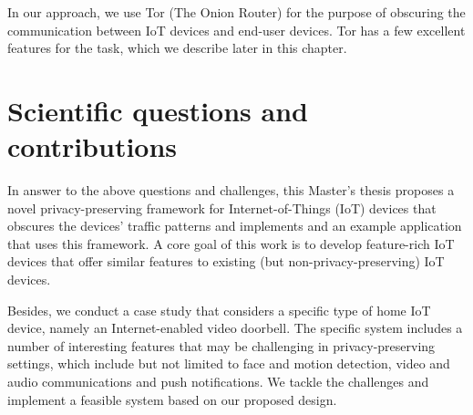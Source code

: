In our approach, we use Tor (The Onion Router) for the purpose of obscuring the communication between IoT devices and end-user devices. Tor has a few excellent features for the task, which we describe later in this chapter.

\section{Scientific questions and contributions}

In answer to the above questions and challenges, this Master's thesis proposes a novel privacy-preserving framework for Internet-of-Things (IoT) devices that obscures the devices' traffic patterns and implements and an example application that uses this framework. A core goal of this work is to develop feature-rich IoT devices that offer similar features to existing (but non-privacy-preserving) IoT devices.

Besides, we conduct a case study that considers a specific type of home IoT device, namely an Internet-enabled video doorbell. The specific system includes a number of interesting features that may be challenging in privacy-preserving settings, which include but not limited to face and motion detection, video and audio communications and push notifications. We tackle the challenges and implement a feasible system based on our proposed design.


